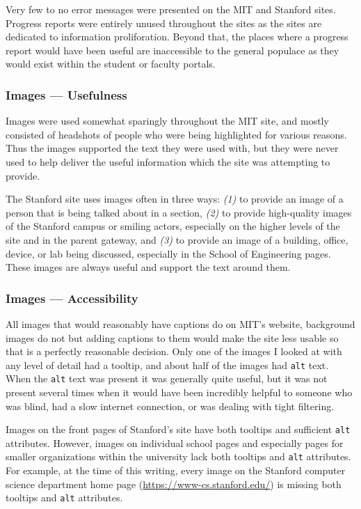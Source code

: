 Very few to no error messages were presented on the MIT and Stanford sites.
Progress reports were entirely unused throughout the sites as the sites are dedicated to
information proliforation. Beyond that, the places where a progress report would have been
useful are inaccessible to the general populace as they would exist within the student or
faculty portals.

\subsubsection*{Images --- Usefulness}

Images were used somewhat sparingly throughout the MIT site, and mostly consisted of headshots of people who were
being highlighted for various reasons. Thus the images supported the text they were used
with, but they were never used to help deliver the useful information which the site
was attempting to provide.

The Stanford site uses images often in three ways: \textit{(1)} to provide an image
of a person that is being talked about in a section, \textit{(2)} to provide high-quality
images of the Stanford campus or smiling actors, especially on the higher levels of
the site and in the parent gateway, and \textit{(3)} to provide an image of a building,
office, device, or lab being discussed, especially in the School of Engineering
pages. These images are always useful and support the text around them.

\subsubsection*{Images --- Accessibility}

All images that would reasonably have captions do on MIT's website, background images do not but
adding captions to them would make the site less usable so that is a perfectly reasonable
decision. Only one of the images I looked at with any level of detail had a tooltip, and
about half of the images had \texttt{alt} text. When the \texttt{alt} text was present it was generally quite
useful, but it was not present several times when it would have been incredibly helpful to
someone who was blind, had a slow internet connection, or was dealing with tight filtering.

Images on the front pages of Stanford's site have both tooltips and sufficient
\texttt{alt} attributes. However, images on individual school pages and especially
pages for smaller organizations within the university lack both tooltips and
\texttt{alt} attributes. For example, at the time of this writing, every image
on the Stanford computer science department home page (\url{https://www-cs.stanford.edu/})
is missing both tooltips and \texttt{alt} attributes.

